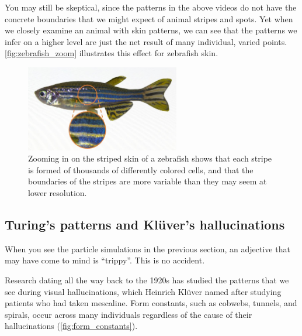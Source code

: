 You may still be skeptical, since the patterns in the above videos do not have the concrete boundaries that we might expect of animal stripes and spots. Yet when we closely examine an animal with skin patterns, we can see that the patterns we infer on a higher level are just the net result of many individual, varied points.  \autoref{fig:zebrafish_zoom} illustrates this effect for zebrafish skin.\\

\begin{figure}[h]
\centering
\mySfFamily
\includegraphics[width = 0.6\textwidth]{../images/zebrafish_zoom.jpg}
\caption{Zooming in on the striped skin of a zebrafish shows that each stripe is formed of thousands of differently colored cells, and that the boundaries of the stripes are more variable than they may seem at lower resolution.}
\label{fig:zebrafish_zoom}
\end{figure}

\FloatBarrier
{}
\subsection{Turing's patterns and Klüver's hallucinations}

When you see the particle simulations in the previous section, an adjective that may have come to mind is ``trippy''. This is no accident.

Research dating all the way back to the 1920s has studied the patterns that we see during visual hallucinations, which Heinrich Klüver named  after studying patients who had taken mescaline. Form constants, such as cobwebs, tunnels, and spirals, occur across many individuals regardless of the cause of their hallucinations (\autoref{fig:form_constants}).\\


